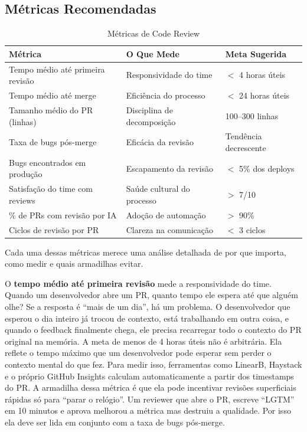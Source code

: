 \subsection{Métricas Recomendadas}

\begin{table}[htbp]
\centering
\caption{Métricas de Code Review}
\begin{tabular}{p{4cm}p{4cm}p{4cm}}
\toprule
\textbf{Métrica} & \textbf{O Que Mede} & \textbf{Meta Sugerida} \\
\midrule
Tempo médio até primeira revisão & Responsividade do time & $<$ 4 horas úteis \\
Tempo médio até merge & Eficiência do processo & $<$ 24 horas úteis \\
Tamanho médio do PR (linhas) & Disciplina de decomposição & 100--300 linhas \\
Taxa de bugs pós-merge & Eficácia da revisão & Tendência decrescente \\
Bugs encontrados em produção & Escapamento da revisão & $<$ 5\% dos deploys \\
Satisfação do time com reviews & Saúde cultural do processo & $>$ 7/10 \\
\% de PRs com revisão por IA & Adoção de automação & $>$ 90\% \\
Ciclos de revisão por PR & Clareza na comunicação & $<$ 3 ciclos \\
\bottomrule
\end{tabular}
\end{table}

Cada uma dessas métricas merece uma análise detalhada de por que importa, como medir
e quais armadilhas evitar.

O \textbf{tempo médio até primeira revisão} mede a responsividade do time. Quando um
desenvolvedor abre um PR, quanto tempo ele espera até que alguém olhe? Se a resposta
é ``mais de um dia'', há um problema. O desenvolvedor que esperou o dia inteiro já
trocou de contexto, está trabalhando em outra coisa, e quando o feedback finalmente
chega, ele precisa recarregar todo o contexto do PR original na memória. A meta de
menos de 4 horas úteis não é arbitrária. Ela reflete o tempo máximo que um
desenvolvedor pode esperar sem perder o contexto mental do que fez. Para medir isso,
ferramentas como LinearB, Haystack e o próprio GitHub Insights calculam
automaticamente a partir dos timestamps do PR. A armadilha dessa métrica é que ela
pode incentivar revisões superficiais rápidas só para ``parar o relógio''. Um
reviewer que abre o PR, escreve ``LGTM'' em 10 minutos e aprova melhorou a métrica
mas destruiu a qualidade. Por isso ela deve ser lida em conjunto com a taxa de bugs
pós-merge.

